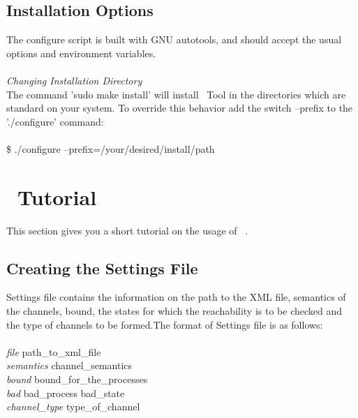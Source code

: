 \subsection{Installation Options}

The configure script is built with GNU autotools, and should accept the usual
options and environment variables.
\\
\\
\emph{Changing Installation Directory} 
\\
The command ’sudo make install’ will install \MPass\ Tool in the directories which are standard on your system. To override this behavior add the switch
--prefix to the ’./configure’ command:
\\
\\
\hspace*{5mm}\$ ./configure --prefix=/your/desired/install/path

\section{ \MPass\ Tutorial}
This section gives you a short tutorial on the usage of \MPass\ .
\subsection{ Creating the Settings File}
Settings file contains the information on the path to the XML file, semantics of the channels, bound, the states for 
which the reachability is to be checked and the type of channels to be formed.The format of Settings file is as follows:
\\
\\
\hspace*{16mm}\emph{file} \hspace*{19mm}     path\_to\_xml\_file
\\
\hspace*{15mm}\emph{semantics} \hspace*{10mm}    channel\_semantics
\\
\hspace*{15mm}\emph{bound} \hspace*{15mm} bound\_for\_the\_processes
\\
\hspace*{15mm}\emph{bad}   \hspace*{19mm}   bad\_process   bad\_state
\\
\hspace*{15mm}\emph{channel\_type}  \hspace*{6mm}   type\_of\_channel
\\\\

